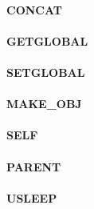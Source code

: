 \documentclass[12pt,a4paper]{article}
\begin{document}
\vspace{2em}\begin{minipage}{\textwidth}
\paragraph{CONCAT}
\end{minipage}

\vspace{2em}\begin{minipage}{\textwidth}
\paragraph{GETGLOBAL}
\end{minipage}

\vspace{2em}\begin{minipage}{\textwidth}
\paragraph{SETGLOBAL}
\end{minipage}

\vspace{2em}\begin{minipage}{\textwidth}
\paragraph{MAKE\_OBJ}
\end{minipage}

\vspace{2em}\begin{minipage}{\textwidth}
\paragraph{SELF}
\end{minipage}

\vspace{2em}\begin{minipage}{\textwidth}
\paragraph{PARENT}
\end{minipage}

\vspace{2em}\begin{minipage}{\textwidth}
\paragraph{USLEEP}
\end{minipage}
\end{document}
